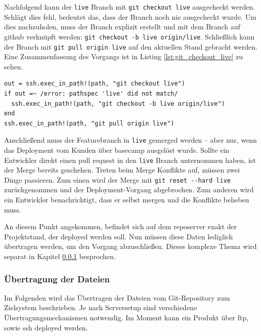 Nachfolgend kann der \lstinline!live! Branch mit \lstinline!git checkout live! ausgecheckt werden. Schlägt dies fehl, bedeutet das, dass der Branch noch nie ausgecheckt wurde. Um dies nachzuholen, muss der Branch explizit erstellt und mit dem Branch auf \gls{github} verknüpft werden: \lstinline!git checkout -b live origin/live!. Schließlich kann der Branch mit \lstinline!git pull origin live! auf den aktuellen Stand gebracht werden. Eine Zusammenfassung des Vorgangs ist in Listing \ref{lst:git_checkout_live} zu sehen.

\begin{lstlisting}[caption=Wechsel auf den aktualisierten Deployment Branch,label={lst:git_checkout_live}]
out = ssh.exec_in_path!(path, "git checkout live")
if out =~ /error: pathspec 'live' did not match/
  ssh.exec_in_path!(path, "git checkout -b live origin/live")
end
ssh.exec_in_path!(path, "git pull origin live")
\end{lstlisting}

Anschließend muss der Featurebranch in \lstinline!live! gemerged werden -- aber nur, wenn das Deployment vom Kunden über \gls{basecamp} ausgelöst wurde. Sollte ein Entwickler direkt einen \gls{pull request} in den \lstinline!live! Branch unternommen haben, ist der Merge bereits geschehen. Treten beim Merge Konflikte auf, müssen zwei Dinge passieren. Zum einen wird der Merge mit \lstinline!git reset --hard live! zurückgenommen und der Deployment-Vorgang abgebrochen. Zum anderen wird ein Entwickler benachrichtigt, dass er selbst mergen und die Konflikte beheben muss.

An diesem Punkt angekommen, befindet sich auf dem \gls{reposerver} exakt der Projektstand, der deployed werden soll. Nun müssen diese Daten lediglich übertragen werden, um den Vorgang abzuschließen. Dieses komplexe Thema wird separat in Kapitel \ref{ssub:uebertragung_der_dateien} besprochen.


\subsubsection{Übertragung der Dateien} %
\label{ssub:uebertragung_der_dateien}

Im Folgenden wird das Übertragen der Dateien vom Git-Repository zum Zielsystem beschrieben. Je nach Serversetup sind verschiedene Übertragungsmechanismen notwendig. Im Moment kann ein Produkt über \gls{ftp}, sowie \gls{ssh} deployed werden.

